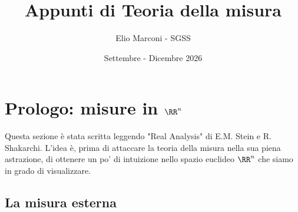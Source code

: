\documentclass[11pt]{scrartcl}
\begin{document}
	\title{Appunti di Teoria della misura}
	\subtitle{Elio Marconi - SGSS}
	\date{Settembre - Dicembre 2026}
	
	
	\maketitle
	
	\tableofcontents
	
	\newpage
	
	\section{Prologo: misure in $\RR^n$}
	
	Questa sezione è stata scritta leggendo "Real Analysis" di E.M. Stein e R. Shakarchi. L'idea è, prima di attaccare la teoria della misura nella sua piena astrazione, di ottenere un po' di intuizione nello spazio euclideo $\RR^n$ che siamo in grado di visualizzare. 
	
	\subsection{La misura esterna}
	
\end{document}
